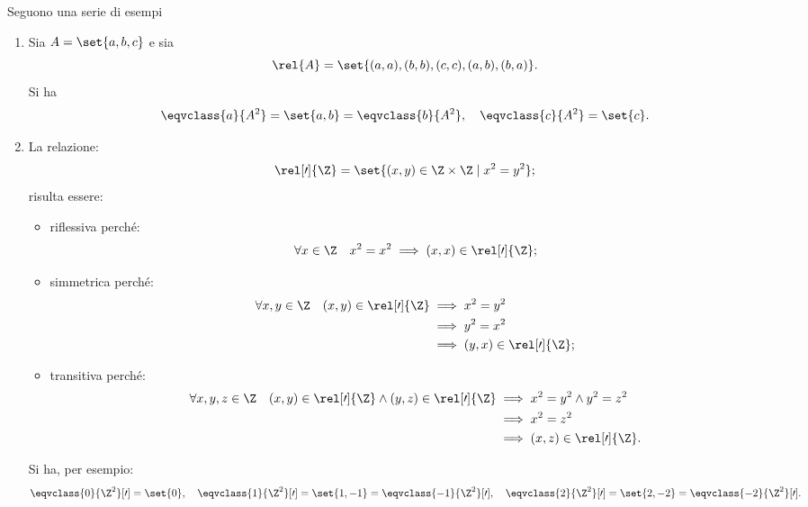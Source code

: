 \begin{examples}
    Seguono una serie di esempi
    \begin{enumerate}
        \item Sia \(A = \set{a, b, c}\) e sia
            \[
                \rel{A} = \set{(a, a), (b, b), (c, c), (a, b), (b, a)}.
            \]
            Si ha
            \[
                \eqvclass{a}{A^2} = \set{a, b} =\eqvclass{b}{A^2},
                \quad
                \eqvclass{c}{A^2} = \set{c}.
            \]
%
        \item La relazione:
            \[
                \rel[\prime]{\Z} = \set{(x, y) \in \Z \times \Z \mid x^2 = y^2};
            \]
            risulta essere:
            \begin{itemize}
                \item riflessiva perché:
                    \[
                        \forall x \in \Z \quad x^2 = x^2 \implies (x, x) \in \rel[\prime]{\Z};
                    \]
                \item simmetrica perché:
                    \begin{alignat*}{1}
                        \forall x,y \in \Z \quad (x, y) \in \rel[\prime]{\Z}
                            &\implies x^2 = y^2   \\
                            &\implies y^2 = x^2   \\
                            &\implies (y, x) \in \rel[\prime]{\Z};
                    \end{alignat*}
                \item transitiva perché:
                    \begin{alignat*}{1}
                        \forall x,y,z \in \Z \quad (x, y) \in \rel[\prime]{\Z} \land (y, z) \in \rel[\prime]{\Z}
                            &\implies x^2 = y^2 \land y^2 = z^2   \\
                            &\implies x^2 = z^2                   \\
                            &\implies (x, z) \in \rel[\prime]{\Z}.
                    \end{alignat*}
            \end{itemize}
            Si ha, per esempio:
            \[
               \eqvclass{0}{\Z^2}[\prime] = \set{0},                                     \quad
               \eqvclass{1}{\Z^2}[\prime] = \set{1, -1} =\eqvclass{-1}{\Z^2}[\prime], \quad
               \eqvclass{2}{\Z^2}[\prime] = \set{2, -2} =\eqvclass{-2}{\Z^2}[\prime].
\]
\end{enumerate}
\end{examples}
